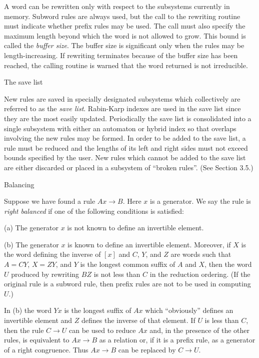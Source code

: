 \nobreak

A word can be rewritten only with respect to the subsystems currently
in memory. Subword rules are always used, but the call to the
rewriting routine must indicate whether prefix rules may be used. The
call must also specify the maximum length beyond which the word is not
allowed to grow. This bound is called the {\it buffer size}.  The
buffer size is significant only when the rules may be
length-increasing. If rewriting terminates because of the buffer size
has been reached, the calling routine is warned that the word returned
is not irreducible.

\bigskip
{} The save list

\nobreak
New rules are saved in specially designated subsystems which
collectively are referred to as the {\it save list}.  Rabin-Karp
indexes are used in the save list since they are the most easily
updated.  Periodically the save list is consolidated into a single
subsystem with either an automaton or hybrid index so that overlaps
involving the new rules may be formed.  In order to be added to the
save list, a rule must be reduced and the lengths of its left and right
sides must not exceed bounds specified by the user.  New rules which
cannot be added to the save list are either discarded or placed in a
subsystem of ``broken rules''.  (See Section 3.5.)

\bigskip
{} Balancing

\nobreak

Suppose we have found a rule $Ax\to B$.  Here $x$ is a generator. We
say the rule is {\it right balanced} if one of the following
conditions is satisfied:

\medskip
{\parindent=20pt
\item{(a)} The generator $x$ is not known to define an invertible
element.
\smallskip
\item{(b)} The generator $x$ is known to define an invertible element.
Moreover, if $X$ is the word defining the inverse of $[x]$ and $C$,
$Y$, and $Z$ are words such that $A = CY$, $X = ZY$, and $Y$ is the
longest common suffix of $A$ and $X$, then the word
$U$ produced by rewriting $BZ$ is not less than $C$ in the reduction
ordering.  (If the original rule is a subword rule, then prefix rules
are not to be used in computing $U$.)\par}

\medskip

\noindent In (b) the word $Yx$ is the longest suffix of $Ax$ which
``obviously'' defines an invertible element and $Z$ defines the
inverse of that element.  If $U$ is less than $C$, then the rule $C\to
U$ can be used to reduce $Ax$ and, in the presence of the other rules,
is equivalent to $Ax\to B$ as a relation or, if it is a prefix rule,
as a generator of a right congruence.  Thus $Ax\to B$ can be replaced
by $C\to U$.

